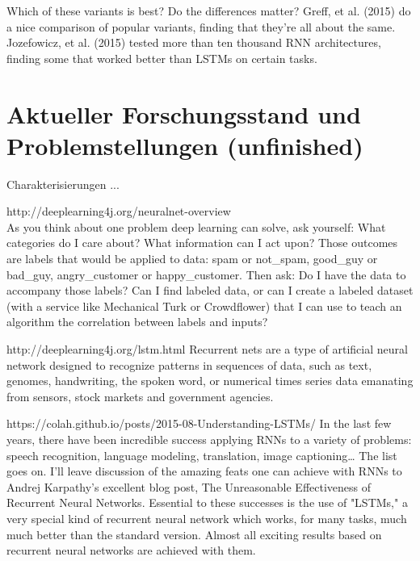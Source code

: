 {Which of these variants is best? Do the differences matter? Greff, et al. (2015) do a nice comparison of popular variants, finding that they’re all about the same. Jozefowicz, et al. (2015) tested more than ten thousand RNN architectures, finding some that worked better than LSTMs on certain tasks.


\section{Aktueller Forschungsstand und Problemstellungen (unfinished)}
Charakterisierungen ...

http://deeplearning4j.org/neuralnet-overview\\
As you think about one problem deep learning can solve, ask yourself: What categories do I care about? What information can I act upon? Those outcomes are labels that would be applied to data: spam or not\_spam, good\_guy or bad\_guy, angry\_customer or happy\_customer. Then ask: Do I have the data to accompany those labels? Can I find labeled data, or can I create a labeled dataset (with a service like Mechanical Turk or Crowdflower) that I can use to teach an algorithm the correlation between labels and inputs?

http://deeplearning4j.org/lstm.html
Recurrent nets are a type of artificial neural network designed to recognize patterns in sequences of data, such as text, genomes, handwriting, the spoken word, or numerical times series data emanating from sensors, stock markets and government agencies.

https://colah.github.io/posts/2015-08-Understanding-LSTMs/
In the last few years, there have been incredible success applying RNNs to a variety of problems: speech recognition, language modeling, translation, image captioning… The list goes on. I’ll leave discussion of the amazing feats one can achieve with RNNs to Andrej Karpathy’s excellent blog post, The Unreasonable Effectiveness of Recurrent Neural Networks.
Essential to these successes is the use of "LSTMs," a very special kind of recurrent neural network which works, for many tasks, much much better than the standard version. Almost all exciting results based on recurrent neural networks are achieved with them.

}
